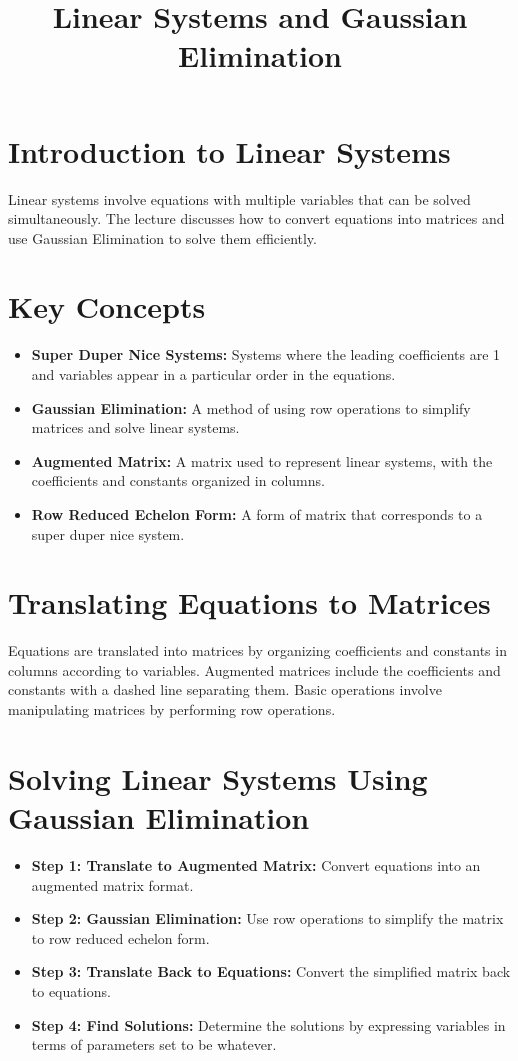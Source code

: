 \documentclass{article}
\begin{document}
\title{Linear Systems and Gaussian Elimination}
\author{}
\date{}
\maketitle

\tableofcontents

\newpage

\section{Introduction to Linear Systems}
Linear systems involve equations with multiple variables that can be solved simultaneously. The lecture discusses how to convert equations into matrices and use Gaussian Elimination to solve them efficiently.

\section{Key Concepts}
\begin{itemize}
  \item \textbf{Super Duper Nice Systems:} Systems where the leading coefficients are 1 and variables appear in a particular order in the equations.
  \item \textbf{Gaussian Elimination:} A method of using row operations to simplify matrices and solve linear systems.
  \item \textbf{Augmented Matrix:} A matrix used to represent linear systems, with the coefficients and constants organized in columns.
  \item \textbf{Row Reduced Echelon Form:} A form of matrix that corresponds to a super duper nice system.
\end{itemize}

\section{Translating Equations to Matrices}
Equations are translated into matrices by organizing coefficients and constants in columns according to variables. Augmented matrices include the coefficients and constants with a dashed line separating them. Basic operations involve manipulating matrices by performing row operations.

\section{Solving Linear Systems Using Gaussian Elimination}
\begin{itemize}
  \item \textbf{Step 1: Translate to Augmented Matrix:} Convert equations into an augmented matrix format.
  \item \textbf{Step 2: Gaussian Elimination:} Use row operations to simplify the matrix to row reduced echelon form.
  \item \textbf{Step 3: Translate Back to Equations:} Convert the simplified matrix back to equations.
  \item \textbf{Step 4: Find Solutions:} Determine the solutions by expressing variables in terms of parameters set to be whatever.
\end{itemize}
\end{document}
